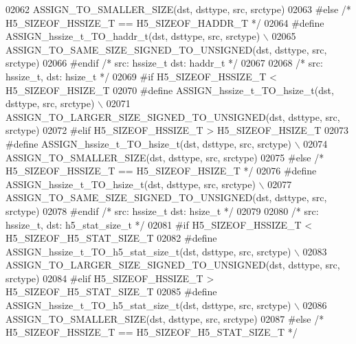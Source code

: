 \begin{DoxyCode}
02062 \textcolor{preprocessor}{        ASSIGN\_TO\_SMALLER\_SIZE(dst, dsttype, src, srctype)}
02063 \textcolor{preprocessor}{#else }\textcolor{comment}{/* H5\_SIZEOF\_HSSIZE\_T == H5\_SIZEOF\_HADDR\_T */}\textcolor{preprocessor}{}
02064 \textcolor{preprocessor}{    #define ASSIGN\_hssize\_t\_TO\_haddr\_t(dst, dsttype, src, srctype) \(\backslash\)}
02065 \textcolor{preprocessor}{        ASSIGN\_TO\_SAME\_SIZE\_SIGNED\_TO\_UNSIGNED(dst, dsttype, src, srctype)}
02066 \textcolor{preprocessor}{#endif }\textcolor{comment}{/* src: hssize\_t dst: haddr\_t */}\textcolor{preprocessor}{}
02067 
02068 \textcolor{comment}{/* src: hssize\_t, dst: hsize\_t */}
02069 \textcolor{preprocessor}{#if H5\_SIZEOF\_HSSIZE\_T < H5\_SIZEOF\_HSIZE\_T}
02070 \textcolor{preprocessor}{    #define ASSIGN\_hssize\_t\_TO\_hsize\_t(dst, dsttype, src, srctype) \(\backslash\)}
02071 \textcolor{preprocessor}{        ASSIGN\_TO\_LARGER\_SIZE\_SIGNED\_TO\_UNSIGNED(dst, dsttype, src, srctype)}
02072 \textcolor{preprocessor}{#elif H5\_SIZEOF\_HSSIZE\_T > H5\_SIZEOF\_HSIZE\_T}
02073 \textcolor{preprocessor}{    #define ASSIGN\_hssize\_t\_TO\_hsize\_t(dst, dsttype, src, srctype) \(\backslash\)}
02074 \textcolor{preprocessor}{        ASSIGN\_TO\_SMALLER\_SIZE(dst, dsttype, src, srctype)}
02075 \textcolor{preprocessor}{#else }\textcolor{comment}{/* H5\_SIZEOF\_HSSIZE\_T == H5\_SIZEOF\_HSIZE\_T */}\textcolor{preprocessor}{}
02076 \textcolor{preprocessor}{    #define ASSIGN\_hssize\_t\_TO\_hsize\_t(dst, dsttype, src, srctype) \(\backslash\)}
02077 \textcolor{preprocessor}{        ASSIGN\_TO\_SAME\_SIZE\_SIGNED\_TO\_UNSIGNED(dst, dsttype, src, srctype)}
02078 \textcolor{preprocessor}{#endif }\textcolor{comment}{/* src: hssize\_t dst: hsize\_t */}\textcolor{preprocessor}{}
02079 
02080 \textcolor{comment}{/* src: hssize\_t, dst: h5\_stat\_size\_t */}
02081 \textcolor{preprocessor}{#if H5\_SIZEOF\_HSSIZE\_T < H5\_SIZEOF\_H5\_STAT\_SIZE\_T}
02082 \textcolor{preprocessor}{    #define ASSIGN\_hssize\_t\_TO\_h5\_stat\_size\_t(dst, dsttype, src, srctype) \(\backslash\)}
02083 \textcolor{preprocessor}{        ASSIGN\_TO\_LARGER\_SIZE\_SIGNED\_TO\_UNSIGNED(dst, dsttype, src, srctype)}
02084 \textcolor{preprocessor}{#elif H5\_SIZEOF\_HSSIZE\_T > H5\_SIZEOF\_H5\_STAT\_SIZE\_T}
02085 \textcolor{preprocessor}{    #define ASSIGN\_hssize\_t\_TO\_h5\_stat\_size\_t(dst, dsttype, src, srctype) \(\backslash\)}
02086 \textcolor{preprocessor}{        ASSIGN\_TO\_SMALLER\_SIZE(dst, dsttype, src, srctype)}
02087 \textcolor{preprocessor}{#else }\textcolor{comment}{/* H5\_SIZEOF\_HSSIZE\_T == H5\_SIZEOF\_H5\_STAT\_SIZE\_T */}\textcolor{preprocessor}{}

\end{DoxyCode}
